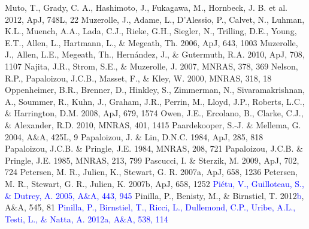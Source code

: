 \documentclass[apj]{emulateapj}
\def\blue#1{\textcolor{blue}{#1}}
\begin{document}
\begin{thebibliography}{}
 Muto, T., Grady, C. A., Hashimoto, J., Fukagawa, M., Hornbeck, J. B. et al. 2012, ApJ, 748L, 22
 Muzerolle, J., Adame, L., D'Alessio, P., Calvet, N., Luhman, K.L., Muench, A.A., Lada, C.J., Rieke, G.H., Siegler, N., Trilling, D.E., Young, E.T., Allen, L., Hartmann, L., \& Megeath, Th. 2006, ApJ, 643, 1003
 Muzerolle, J., Allen, L.E., Megeath, Th., Hern\'andez, J., \& Gutermuth, R.A. 2010, ApJ, 708, 1107
 Najita, J.R., Strom, S.E., \& Muzerolle, J. 2007, MNRAS, 378, 369
 Nelson, R.P., Papaloizou, J.C.B., Masset, F., \& Kley, W. 2000, MNRAS, 318, 18
 Oppenheimer, B.R., Brenner, D., Hinkley, S., Zimmerman, N., Sivaramakrishnan, A., Soummer, R., Kuhn, J., Graham, J.R., Perrin, M., Lloyd, J.P., Roberts, L.C., \& Harrington, D.M. 2008, ApJ, 679, 1574
 Owen, J.E., Ercolano, B., Clarke, C.J., \& Alexander, R.D. 2010, MNRAS, 401, 1415
 Paardekooper, S.-J. \& Mellema, G.	2004, A\&A, 425L, 9
 Papaloizou, J. \& Lin, D.N.C. 1984, ApJ, 285, 818
 Papaloizou, J.C.B. \& Pringle, J.E. 1984, MNRAS, 208, 721
 Papaloizou, J.C.B. \& Pringle, J.E. 1985, MNRAS, 213, 799
 Pascucci, I. \& Sterzik, M. 2009, ApJ, 702, 724
 Petersen, M. R., Julien, K., Stewart, G. R. 2007a, ApJ, 658, 1236
 Petersen, M. R., Stewart, G. R., Julien, K. 2007b, ApJ, 658, 1252
\bibitem[{{\blue{Pi\'etu et al.}}(2005)}]{Pietu05} \blue{Pi\'etu, V., Guilloteau, S., \& Dutrey, A. 2005, A\&A, 443, 945}
 Pinilla, P., Benisty, M., \& Birnstiel, T. 2012\blue{b}, A\&A, 545, 81
\bibitem[{{\blue{Pinilla et al.}}(2012a)}]{Pinilla12a} \blue{Pinilla, P., Birnstiel, T., Ricci, L., Dullemond, C.P., Uribe, A.L., Testi, L., \& Natta, A. 2012a, A\&A, 538, 114} 

\end{thebibliography}
\end{document}
